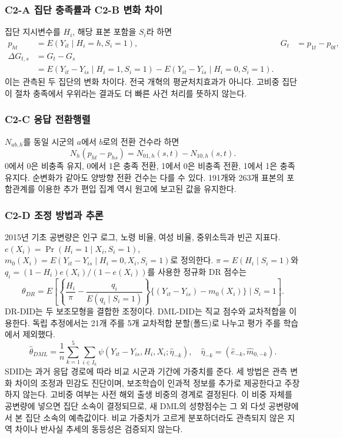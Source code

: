 \documentclass[11pt,a4paper]{article}
\begin{document}
\subsubsection{C2-A 집단 충족률과 C2-B 변화 차이}
집단 지시변수를 $H_i$, 해당 표본 포함을 $S_i$라 하면
\begin{align}
p_{ht}&=E(Y_{it}\mid H_i=h,S_i=1),&G_t&=p_{1t}-p_{0t},\\
\Delta G_{t,s}&=G_t-G_s\nonumber\\
&=E(Y_{it}-Y_{is}\mid H_i=1,S_i=1)-E(Y_{it}-Y_{is}\mid H_i=0,S_i=1).
\end{align}
이는 관측된 두 집단의 변화 차이다. 전국 개혁의 평균처치효과가 아니다. 고비중 집단이 절차 충족에서 우위라는 결과도 더 빠른 사건 처리를 뜻하지 않는다.

\subsubsection{C2-C 응답 전환행렬}
$N_{ab,h}$를 동일 시군의 $a$에서 $b$로의 전환 건수라 하면
\begin{equation}N_h(p_{ht}-p_{hs})=N_{01,h}(s,t)-N_{10,h}(s,t).\end{equation}
0에서 0은 비충족 유지, 0에서 1은 충족 전환, 1에서 0은 비충족 전환, 1에서 1은 충족 유지다. 순변화가 같아도 양방향 전환 건수는 다를 수 있다. 191개와 263개 표본의 포함관계를 이용한 추가 편입 집계 역시 원고에 보고된 값을 유지한다.

\subsubsection{C2-D 조정 방법과 추론}
2015년 기초 공변량은 인구 로그, 노령 비율, 여성 비율, 중위소득과 빈곤 지표다. $e(X_i)=\Pr(H_i=1\mid X_i,S_i=1)$, $m_0(X_i)=E(Y_{it}-Y_{is}\mid H_i=0,X_i,S_i=1)$로 정의한다. $\pi=E(H_i\mid S_i=1)$와 $q_i=(1-H_i)e(X_i)/(1-e(X_i))$를 사용한 정규화 DR 점수는
\begin{equation}\theta_{DR}=E\left[\left\{\frac{H_i}{\pi}-\frac{q_i}{E(q_i\mid S_i=1)}\right\}\{(Y_{it}-Y_{is})-m_0(X_i)\}\mid S_i=1\right].\end{equation}
DR-DID는 두 보조모형을 결합한 조정이다\cite{sz}. DML-DID는 직교 점수와 교차적합을 이용한다\cite{dml}. 독립 추정에서는 21개 주를 5개 교차적합 분할(폴드)로 나누고 평가 주를 학습에서 제외했다.
\begin{equation}\widehat\theta_{DML}=\frac{1}{n}\sum_{k=1}^{5}\sum_{i\in I_k}\psi(Y_{it}-Y_{is},H_i,X_i;\widehat\eta_{-k}),\quad\widehat\eta_{-k}=(\widehat e_{-k},\widehat m_{0,-k}).\end{equation}
SDID는 과거 응답 경로에 따라 비교 시군과 기간에 가중치를 준다\cite{sdid}. 세 방법은 관측 변화 차이의 조정과 민감도 진단이며, 보조학습이 인과적 정보를 추가로 제공한다고 주장하지 않는다. 고비중 여부는 사전 해외 출생 비중의 경계로 결정된다. 이 비중 자체를 공변량에 넣으면 집단 소속이 결정되므로, 새 DML의 성향점수는 그 외 다섯 공변량에서 본 집단 소속의 예측값이다. 비교 가중치가 고르게 분포하더라도 관측되지 않은 지역 차이나 반사실 추세의 동등성은 검증되지 않는다.
\end{document}
